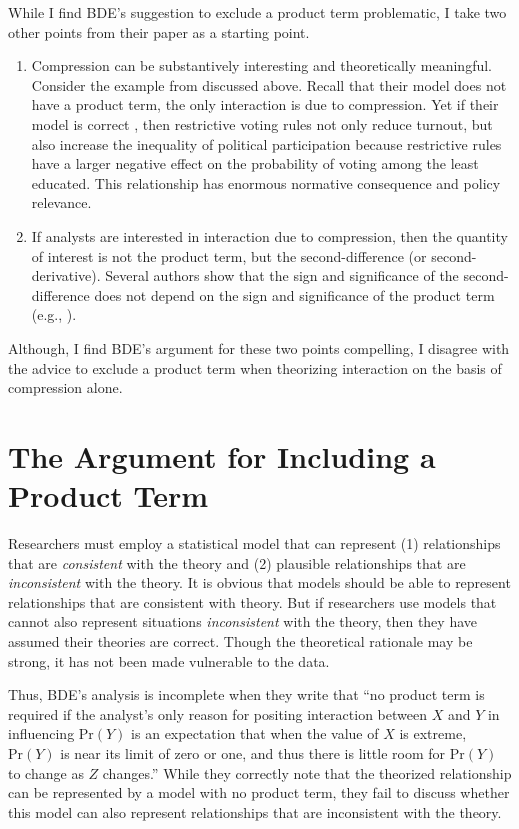 \documentclass[12pt]{article}
\begin{document}
\doublespace
While I find BDE's suggestion to exclude a product term problematic, I take two other points from their paper as a starting point.
\begin{enumerate}
\item Compression can be substantively interesting and theoretically meaningful. Consider the example from \cite{WolfingerRosenstone1980} discussed above. Recall that their model does not have a product term, the only interaction is due to compression. Yet if their model is correct , then restrictive voting rules not only reduce turnout, but also increase the inequality of political participation because restrictive rules have a larger negative effect on the probability of voting among the least educated. This relationship has  enormous normative consequence and policy relevance.
\item If analysts are interested in interaction due to compression, then the quantity of interest is not the product term, but the second-difference (or second-derivative). Several authors show that the sign and significance of the second-difference does not depend on the sign and significance of the product term (e.g., \citealt{TsaiGill2013, AiNorton2003}).
\end{enumerate}
 Although, I find BDE's argument for these two points compelling, I disagree with the advice to exclude a product term when theorizing interaction on the basis of compression alone.

\section*{The Argument for Including a Product Term}

Researchers must employ a statistical model that can represent (1) relationships that are \emph{consistent} with the theory and (2) plausible relationships that are \emph{inconsistent} with the theory. It is obvious that models should be able to represent relationships that are consistent with theory. But if researchers use models that cannot also represent situations \emph{inconsistent} with the theory, then they have assumed their theories are correct. Though the theoretical rationale may be strong, it has not been made vulnerable to the data.

Thus, BDE's analysis is incomplete when they write that ``no product term is required if the analyst's only reason for positing interaction between $X$ and $Y$ in influencing $\text{Pr}(Y)$ is an expectation that when the value of $X$ is extreme, $\text{Pr}(Y)$ is near its limit of zero or one, and thus there is little room for $\text{Pr}(Y)$ to change as $Z$ changes.'' While they correctly note that the theorized relationship can be represented by a model with no product term, they fail to discuss whether this model can also represent relationships that are inconsistent with the theory.
\end{document}
